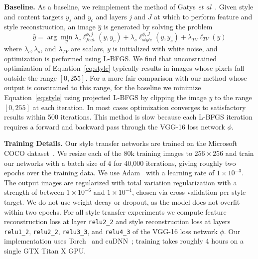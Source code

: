 \documentclass[runningheads]{llncs}
\newcommand{\etal}{\textit{et al}}
\begin{document}
\vspace{1mm}
\noindent \textbf{Baseline.}
As a baseline, we reimplement the method of Gatys \etal~\cite{gatys2015neural}. Given style
and content targets $y_s$ and $y_c$ and layers $j$ and $J$ at which to perform feature and
style reconstruction, an image $\hat y$ is generated by solving the problem
\begin{equation}
  \hat y = \arg\min_{y} \lambda_c \ell_{feat}^{\phi,j}(y, y_c)
    + \lambda_s\ell_{style}^{\phi,J}(y, y_s) + \lambda_{TV} \ell_{TV}(y)
  \label{eq:style}
\end{equation}
where $\lambda_c,\lambda_s$, and $\lambda_{TV}$ are scalars, $y$ is initialized with white
noise, and optimization is performed using L-BFGS. We find that unconstrained optimization of
Equation~\ref{eq:style} typically results in images whose pixels fall outside the range
$[0, 255]$. For a more fair comparison with our method whose output is constrained to this
range, for the baseline we minimize Equation~\ref{eq:style} using projected L-BFGS by
clipping the image $y$ to the range $[0, 255]$ at each iteration. In most cases optimization
converges to satisfactory results within 500 iterations. This method is slow because each
L-BFGS iteration requires a forward and backward pass through the VGG-16 loss network $\phi$. 

\vspace{1mm}
\noindent \textbf{Training Details.}
Our style transfer networks are trained on the Microsoft COCO dataset~\cite{lin2014microsoft}.
We resize each of the 80k training images to $256\times256$ and train our networks with
a batch size of 4 for 40,000 iterations, giving roughly two epochs over the training data.
We use Adam~\cite{kingma2014adam} with a learning rate of $1\times10^{-3}$. The output images
are regularized with total variation regularization with a strength of between $1\times10^{-6}$
and $1\times10^{-4}$, chosen via cross-validation per style target. We do not use weight decay
or dropout, as the model does not overfit within two epochs. For all style transfer experiments
we compute feature reconstruction loss at layer \verb.relu2_2. and style reconstruction
loss at layers \verb.relu1_2., \verb.relu2_2., \verb.relu3_3., and \verb.relu4_3. of the
VGG-16 loss network $\phi$.
Our implementation uses Torch~\cite{collobert2011torch7} and cuDNN~\cite{chetlur2014cudnn};
training takes roughly 4 hours on a single GTX Titan X GPU. 
\end{document}

